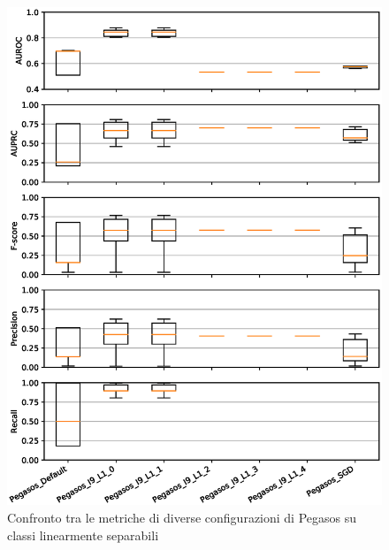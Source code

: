 \begin{figure}[hb]%
    \centering
    \includegraphics[scale = 0.80]{CC-Pegasos-level1-LS}%
    \caption{Confronto tra le metriche di diverse configurazioni di Pegasos su classi linearmente separabili}%
    \label{figure:illps}%
\end{figure}

\vspace*{\fill}


